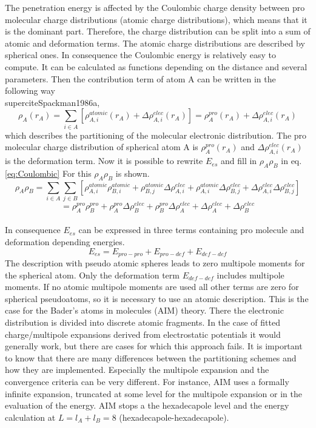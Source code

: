 \documentclass[10pt,a4paper]{article} %
\begin{document}
The penetration energy is affected by the Coulombic charge density
between pro molecular charge distributions (atomic charge distributions),
which means that it is the dominant part. Therefore, the charge distribution
can be split into a sum of atomic and deformation terms. The atomic
charge distributions are described by spherical ones. In consequence
the Coulombic energy is relatively easy to compute. It can be calculated
as functions depending on the distance and several parameters. Then
the contribution term of atom A can be written in the following way\\supercite{Spackman1986a},
\begin{equation}
\rho_{A}(r_{A})=\sum_{i\in A}[\rho_{A,i}^{atomic}(r_{A})+\Delta\rho_{A,i}^{elec}(r_{A})]=\rho_{A}^{pro}(r_{A})+\Delta\rho_{A,i}^{elec}(r_{A})
\end{equation}
which describes the partitioning of the molecular electronic distribution.
The pro molecular charge distribution of spherical atom A is $\rho_{A}^{pro}(r_{A})$
and $\Delta\rho_{A,i}^{elec}(r_{A})$ is the deformation term. Now
it is possible to rewrite $E_{es}$ and fill in $\rho_{A}\rho_{B}$
in eq. \ref{eq:Coulombic} For this $\rho_{A}\rho_{B}$ is shown.
\[
\rho_{A}\rho_{B}=\sum_{i\in A}\sum_{j\in B}[\rho_{A,i}^{atomic}\rho_{B,i}^{atomic}+\rho_{B,j}^{atomic}\Delta\rho_{A,i}^{elec}+\rho_{A,i}^{atomic}\Delta\rho_{B,j}^{elec}+\Delta\rho_{A,i}^{elec}\Delta\rho_{B,j}^{elec}]
\]
\begin{equation}
=\rho_{A}^{pro}\rho_{B}^{pro}+\rho_{A}^{pro}\Delta\rho_{B}^{elec}+\rho_{B}^{pro}\Delta\rho_{A}^{elec}+\Delta\rho_{A}^{elec}+\Delta\rho_{B}^{elec}
\end{equation}
\\
In consequence $E_{es}$ can be expressed in three terms containing
pro molecule and deformation depending energies.
\begin{equation}
E_{es}=E_{pro-pro}+E_{pro-def}+E_{def-def}\label{Ees}
\end{equation}
The description with pseudo atomic spheres leads to zero multipole
moments for the spherical atom. Only the deformation term $E_{def-def}$
includes multipole moments. If no atomic multipole moments are used
all other terms are zero for spherical pseudoatoms, so it is necessary
to use an atomic description. This is the case for the Bader's atoms
in molecules (AIM) theory. There the electronic distribution is divided
into discrete atomic fragments. In the case of fitted charge/multipole
expansions derived from electrostatic potentials it would generally
work, but there are cases for which this approach fails. It is important
to know that there are many differences between the partitioning schemes
and how they are implemented. Especially the multipole expansion and
the convergence criteria can be very different. For instance, AIM
uses a formally infinite expansion, truncated at some level for the
multipole expansion or in the evaluation of the energy. AIM stops
a the hexadecapole level and the energy calculation at $L=l_{A}+l_{B}=8$
(hexadecapole-hexadecapole).
\end{document}
